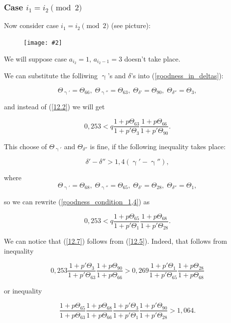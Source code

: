 \documentclass[a4paper, 12pt]{article}
\let\oldref\ref
\renewcommand{\ref}[1]{(\oldref{#1})}
\theoremstyle{definition}
\theoremstyle{definition}
\theoremstyle{proposition}
\theoremstyle{lemma}
\newcommand{\g}{\upgamma}
\renewcommand{\d}{\delta}
\newcommand{\T}{\Theta}
\newcommand{\Ts}[5][,]{%
	\begin{equation*}
		\T_{\g'} = \T_{#2},\;
		\T_{\g''} = \T_{#3},\;
		\T_{\d'} = \T_{#4},\;
		\T_{\d''} = \T_{#5}{#1}
	\end{equation*}%
}
\newcommand{\pic}[2][1]{%
	\begin{figure}[H]
		\centering
		\texttt{[image: \#2]}
	\end{figure}
}
\begin{document}
\subsubsection{Case $i_1 = i_2 \pmod 2$}

Now consider case $i_1 = i_2 \pmod 2$ (see picture):

\pic[0.5]{pic4}

We will suppose case $a_{i_2} = 1$, $a_{i_2 - 1} = 3$ doesn't take place.

We can substitute the folliwing $\g$'s and $\d$'s
into \ref{goodness_in_deltas}:

\Ts{66}{63}{90}{3}

and instead of \ref{12.2} we will get

\begin{equation}\tag{12.5}\label{12.5}
	0,253 < q
	\dfrac{1 + p \T_{63}}{1 + p' \T_{3}}
	\dfrac{1 + p \T_{66}}{1 + p' \T_{90}}.
\end{equation}

This choose of $\T_{\g'}$ and $\T_{\d''}$ is fine,
if the following inequality takes place:

\begin{equation}\tag{12.6}\label{goodness_condition_1,4}
	\d' - \d'' > 1,4 (\g' - \g''),
\end{equation}

where 
\begin{equation*}
	\T_{\g'} = \T_{68},\;
	\T_{\g''} = \T_{65},\;
	\T_{\d'} = \T_{28},\;
	\T_{\d''} = \T_{1},
\end{equation*}

so we can rewrite \ref{goodness_condition_1,4} as

\begin{equation}\tag{12.7}\label{12.7}
	0,253 < q
	\dfrac{1 + p \T_{65}}{1 + p' \T_{1}}
	\dfrac{1 + p \T_{68}}{1 + p' \T_{28}}.
\end{equation}

We can notice that \ref{12.7} follows from \ref{12.5}. Indeed, that follows from inequality

\begin{equation*}
	0,253
	\dfrac{1 + p' \T_{3}}{1 + p' \T_{63}}
	\dfrac{1 + p \T_{90}}{1 + p \T_{66}}
	>
	0,269
	\dfrac{1 + p' \T_{1}}{1 + p' \T_{65}}
	\dfrac{1 + p \T_{28}}{1 + p \T_{68}}
\end{equation*}

or inequality

\begin{equation*}
	\dfrac{1 + p \T_{65}}{1 + p \T_{63}}
	\dfrac{1 + p \T_{68}}{1 + p \T_{66}}
	\dfrac{1 + p' \T_{3}}{1 + p' \T_{1}}
	\dfrac{1 + p' \T_{90}}{1 + p' \T_{28}}
	>
	1,064.
\end{equation*}
\end{document}
